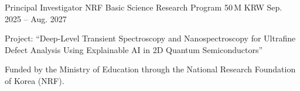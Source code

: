 \documentclass[11pt, a4paper]{awesome-cv}
\begin{document}
\begin{cventries}
  \cventry
    {Principal Investigator}
    {NRF Basic Science Research Program}
    {50\,M KRW}
    {Sep. 2025 -- Aug. 2027}
    {
      \begin{cvitems}
        \item {Project: ``Deep-Level Transient Spectroscopy and Nanospectroscopy for Ultrafine Defect Analysis Using Explainable AI in 2D Quantum Semiconductors''}
        \item {Funded by the Ministry of Education through the National Research Foundation of Korea (NRF).}
      \end{cvitems}
    }
\end{cventries}
\end{document}
